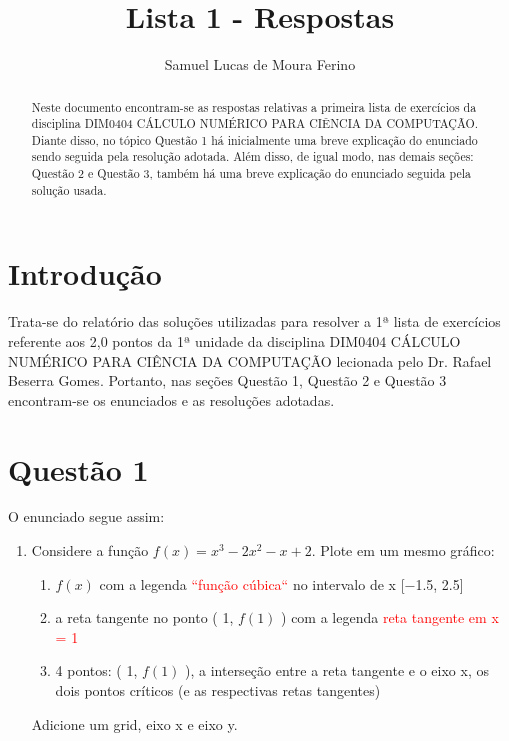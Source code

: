 \documentclass[acmlarge,screen]{acmart}
\begin{document}
\title{Lista 1 - Respostas}


\author{Samuel Lucas de Moura Ferino}

\begin{abstract}
Neste documento encontram-se as respostas relativas a primeira lista de exercícios da disciplina DIM0404 CÁLCULO NUMÉRICO PARA  CIÊNCIA DA COMPUTAÇÃO. Diante disso, no tópico Questão 1 há inicialmente uma breve explicação do enunciado sendo seguida pela resolução adotada. Além disso, de igual modo, nas demais seções: Questão 2 e Questão 3, também há uma breve explicação do enunciado seguida pela solução usada.    
\end{abstract}


\maketitle

\section{Introdução}
Trata-se do relatório das soluções utilizadas para resolver a 1ª lista de exercícios referente aos 2,0 pontos da 1ª unidade da disciplina DIM0404 CÁLCULO NUMÉRICO PARA  CIÊNCIA DA COMPUTAÇÃO lecionada pelo Dr. Rafael Beserra Gomes. Portanto, nas seções Questão 1, Questão 2 e Questão 3 encontram-se os enunciados e as resoluções adotadas.

\section{Questão 1}

O enunciado segue assim:
\newline
\begin{enumerate}
    \item Considere a função $f(x) = x^3 - 2x^2 - x + 2$. Plote em um mesmo gráfico:
    
    \begin{enumerate}
        \item $f(x)$ com a legenda \textcolor{red}{``função cúbica``} no intervalo de x [−1.5, 2.5]
        \item a reta tangente no ponto ( 1, $f(1)$ ) com a legenda \textcolor{red}{reta tangente em x = 1 }
        \item 4 pontos: ( 1, $f(1)$ ), a interseção entre a reta tangente e o eixo x, os dois pontos críticos (e as respectivas retas tangentes) 

    
    \end{enumerate}
    
    Adicione um grid, eixo x e eixo y.
    
\end{enumerate}
\end{document}
